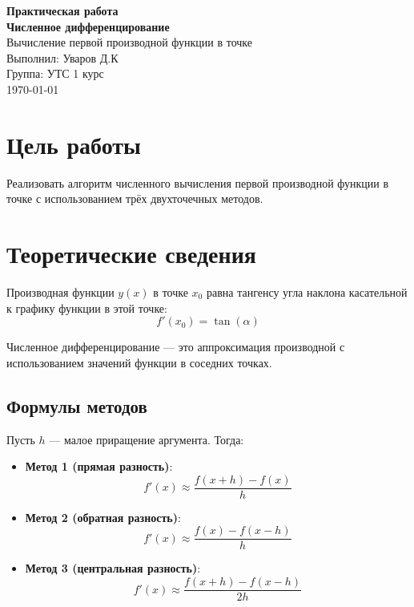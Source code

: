 \documentclass[12pt,a4paper]{article}
\begin{document}
\begin{titlepage}
    \centering
    {\Large \textbf{Практическая работа}} \\[0.5cm]
    {\huge \textbf{Численное дифференцирование}} \\[1.5cm]
    {\Large Вычисление первой производной функции в точке} \\[2cm]
    {\large Выполнил: Уваров Д.К} \\[1cm]
    {\large Группа: УТС 1 курс} \\[15cm]
    {\large \today}
\end{titlepage}

\section{Цель работы}

Реализовать алгоритм численного вычисления первой производной функции в точке с использованием трёх двухточечных методов.

\section{Теоретические сведения}

Производная функции $y(x)$ в точке $x_0$ равна тангенсу угла наклона касательной к графику функции в этой точке:
\[
f'(x_0) = \tan(\alpha)
\]

Численное дифференцирование — это аппроксимация производной с использованием значений функции в соседних точках.

\subsection{Формулы методов}

Пусть $h$ — малое приращение аргумента. Тогда:

\begin{itemize}
    \item \textbf{Метод 1 (прямая разность)}:
    \[
    f'(x) \approx \frac{f(x+h) - f(x)}{h}
    \]
    
    \item \textbf{Метод 2 (обратная разность)}:
    \[
    f'(x) \approx \frac{f(x) - f(x-h)}{h}
    \]
    
    \item \textbf{Метод 3 (центральная разность)}:
    \[
    f'(x) \approx \frac{f(x+h) - f(x-h)}{2h}
    \]
\end{itemize}
\end{document}
